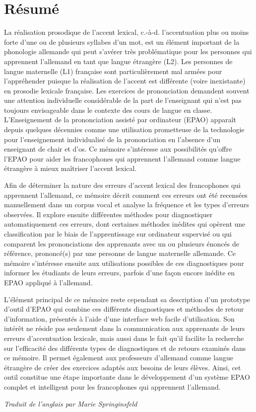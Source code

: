 %
\chapter*{Résumé}
\label{sec:abstract:fr}
\vspace*{-10mm}

La réalisation prosodique de l'accent lexical, c.-à-d. l'accentuation plus ou moins forte d'une ou de plusieurs syllabes d'un mot, est un élément important de la phonologie allemande qui peut s'avérer très problématique pour les personnes qui apprennent l'allemand en tant que langue étrangère (L2). Les personnes de langue maternelle (L1) française sont particulièrement mal armées pour l'appréhender puisque la réalisation de l'accent est différente (voire inexistante) en prosodie lexicale française. Les exercices de prononciation demandent souvent une attention individuelle considérable de la part de l'enseignant qui n'est pas toujours envisageable dans le contexte des cours de langue en classe. L'Enseignement de la prononciation assisté par ordinateur (EPAO) apparaît depuis quelques décennies comme une utilisation prometteuse de la technologie pour l'enseignement individualisé de la prononciation en l'absence d'un enseignant de chair et d'os. Ce mémoire s'intéresse aux possibilités qu'offre l'EPAO pour aider les francophones qui apprennent l'allemand comme langue étrangère à mieux maîtriser l'accent lexical.

Afin de déterminer la nature des erreurs d'accent lexical des francophones qui apprennent l'allemand, ce mémoire décrit comment ces erreurs ont été recensées manuellement dans un corpus vocal et analyse la fréquence et les types d'erreurs observées. Il explore ensuite différentes méthodes pour diagnostiquer automatiquement ces erreurs, dont certaines méthodes inédites qui opèrent une classification par le biais de l'apprentissage sur ordinateur supervisé ou qui comparent les prononciations des apprenants avec un ou plusieurs énoncés de référence, prononcé(s) par une personne de langue maternelle allemande. Ce mémoire s'intéresse ensuite aux utilisations possibles de ces diagnostiques pour informer les étudiants de leurs erreurs, parfois d'une façon encore inédite en EPAO appliqué à l'allemand.

L'élément principal de ce mémoire reste cependant sa description d'un prototype d'outil d'EPAO 
qui combine ces différents diagnostiques et méthodes de retour d'information, présentés à l'aide d'une interface web facile d'utilisation. Son intérêt ne réside pas seulement dans la communication aux apprenants  de leurs erreurs d'accentuation lexicale, mais aussi dans le fait qu'il facilite la recherche sur l'efficacité des différents types de diagnostiques et de retours examinés dans ce mémoire. Il permet également aux professeurs d'allemand comme langue étrangère de créer des exercices adaptés aux besoins de leurs élèves. Ainsi, cet outil constitue une étape importante dans le développement d'un système EPAO complet et intelligent pour les francophones qui apprennent l'allemand.

\begin{flushright}
\textit{Traduit de l'anglais par Marie Springinsfeld}
\end{flushright}
